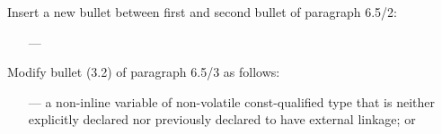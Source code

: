 \noindent
Insert a new bullet between first and second bullet of paragraph 6.5/2:

\begin{std.txt}\color{addclr}
  \begin{itemize}
    \item[---] 
  \end{itemize}
\end{std.txt}

\noindent
Modify bullet (3.2) of paragraph 6.5/3 as follows:
\begin{std.txt}
  \begin{itemize}
    \item[---] a non-inline  variable of non-volatile const-qualified type 
    that is neither explicitly declared  nor
    previously declared to have external  linkage; or
  \end{itemize}
\end{std.txt}

